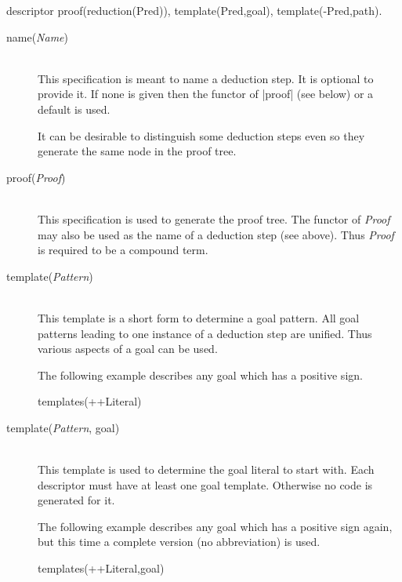 \begin{BoxedSample}
descriptor
        proof(reduction(Pred)),
        template(Pred,goal),
        template(-Pred,path).
\end{BoxedSample}



\begin{description}
  \item [name({\em Name})]\ 
    \\
    This specification is meant to name a deduction step. It is optional to
    provide it. If none is given then the functor of |proof| (see below) or a
    default is used.

    It can be desirable to distinguish some deduction steps even so they
    generate the same node in the proof tree.

  \item [proof({\em Proof})]\ 
    \\
    This specification is used to generate the proof tree. The functor of {\em
      Proof}\/ may also be used as the name of a deduction step (see above).
    Thus {\em Proof}\/ is required to be a compound term.

  \item [template({\em Pattern})]\ 
    \\
    This template is a short form to determine a goal pattern. All goal
    patterns leading to one instance of a deduction step are unified. Thus
    various aspects of a goal can be used.

    The following example describes any goal which has a positive sign.

    \begin{BoxedSample}
      templates(++Literal)%
    \end{BoxedSample}

  \item [template({\em Pattern}, goal)]\ 
    \\
    This template is used to determine the goal literal to start with.
    Each descriptor must have at least one goal template. Otherwise no 	code
    is generated for it.

    The following example describes any goal which has a positive sign 	again,
    but this time a complete version (no abbreviation) is used.

    \begin{BoxedSample}
      templates(++Literal,goal)%
    \end{BoxedSample}


\end{description}
